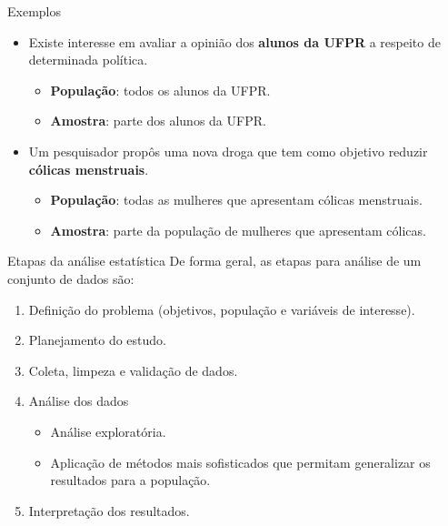 \documentclass[
  ignorenonframetext,
  serif,
  professionalfont,
  usenames,
  dvipsnames,
  aspectratio = 169]{beamer}
\providecommand{\tightlist}{%
  \setlength{\itemsep}{0pt}\setlength{\parskip}{0pt}}
\renewcommand{\tightlist}{%
  \setlength{\itemsep}{0\baselineskip}
  \setlength{\parskip}{0.25\baselineskip}
}
\begin{document}
\begin{frame}{Exemplos}
\protect\hypertarget{exemplos}{}
\begin{itemize}
\tightlist
\item
  Existe interesse em avaliar a opinião dos \textbf{alunos da UFPR} a
  respeito de determinada política.

  \begin{itemize}
  \tightlist
  \item
    \textbf{População}: todos os alunos da UFPR.
  \item
    \textbf{Amostra}: parte dos alunos da UFPR.
  \end{itemize}
\item
  Um pesquisador propôs uma nova droga que tem como objetivo reduzir
  \textbf{cólicas menstruais}.

  \begin{itemize}
  \tightlist
  \item
    \textbf{População}: todas as mulheres que apresentam cólicas
    menstruais.
  \item
    \textbf{Amostra}: parte da população de mulheres que apresentam
    cólicas.
  \end{itemize}
\end{itemize}
\end{frame}

\begin{frame}{Etapas da análise estatística}
\protect\hypertarget{etapas-da-anuxe1lise-estatuxedstica}{}
De forma geral, as etapas para análise de um conjunto de dados são:

\begin{enumerate}
\tightlist
\item
  Definição do problema (objetivos, população e variáveis de interesse).
\item
  Planejamento do estudo.
\item
  Coleta, limpeza e validação de dados.
\item
  Análise dos dados

  \begin{itemize}
  \tightlist
  \item
    Análise exploratória.
  \item
    Aplicação de métodos mais sofisticados que permitam generalizar os
    resultados para a população.
  \end{itemize}
\item
  Interpretação dos resultados.
\end{enumerate}
\end{frame}
\end{document}
